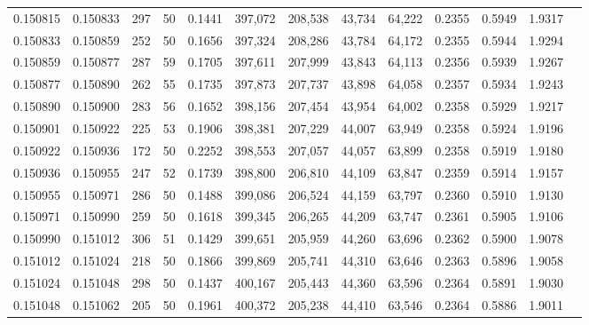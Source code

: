 \begin{tabular}{rrrrrrrrrrrrr}
0.150815 & 0.150833 &   297 &  50 &                                     0.1441 & 397,072 & 208,538 &  43,734 &  64,222 & 0.2355 & 0.5949 & 1.9317 \\
0.150833 & 0.150859 &   252 &  50 &                                     0.1656 & 397,324 & 208,286 &  43,784 &  64,172 & 0.2355 & 0.5944 & 1.9294 \\
0.150859 & 0.150877 &   287 &  59 &                                     0.1705 & 397,611 & 207,999 &  43,843 &  64,113 & 0.2356 & 0.5939 & 1.9267 \\
0.150877 & 0.150890 &   262 &  55 &                                     0.1735 & 397,873 & 207,737 &  43,898 &  64,058 & 0.2357 & 0.5934 & 1.9243 \\
0.150890 & 0.150900 &   283 &  56 &                                     0.1652 & 398,156 & 207,454 &  43,954 &  64,002 & 0.2358 & 0.5929 & 1.9217 \\
0.150901 & 0.150922 &   225 &  53 &                                     0.1906 & 398,381 & 207,229 &  44,007 &  63,949 & 0.2358 & 0.5924 & 1.9196 \\
0.150922 & 0.150936 &   172 &  50 &                                     0.2252 & 398,553 & 207,057 &  44,057 &  63,899 & 0.2358 & 0.5919 & 1.9180 \\
0.150936 & 0.150955 &   247 &  52 &                                     0.1739 & 398,800 & 206,810 &  44,109 &  63,847 & 0.2359 & 0.5914 & 1.9157 \\
0.150955 & 0.150971 &   286 &  50 &                                     0.1488 & 399,086 & 206,524 &  44,159 &  63,797 & 0.2360 & 0.5910 & 1.9130 \\
0.150971 & 0.150990 &   259 &  50 &                                     0.1618 & 399,345 & 206,265 &  44,209 &  63,747 & 0.2361 & 0.5905 & 1.9106 \\
0.150990 & 0.151012 &   306 &  51 &                                     0.1429 & 399,651 & 205,959 &  44,260 &  63,696 & 0.2362 & 0.5900 & 1.9078 \\
0.151012 & 0.151024 &   218 &  50 &                                     0.1866 & 399,869 & 205,741 &  44,310 &  63,646 & 0.2363 & 0.5896 & 1.9058 \\
0.151024 & 0.151048 &   298 &  50 &                                     0.1437 & 400,167 & 205,443 &  44,360 &  63,596 & 0.2364 & 0.5891 & 1.9030 \\
0.151048 & 0.151062 &   205 &  50 &                                     0.1961 & 400,372 & 205,238 &  44,410 &  63,546 & 0.2364 & 0.5886 & 1.9011 \\

\end{tabular}
